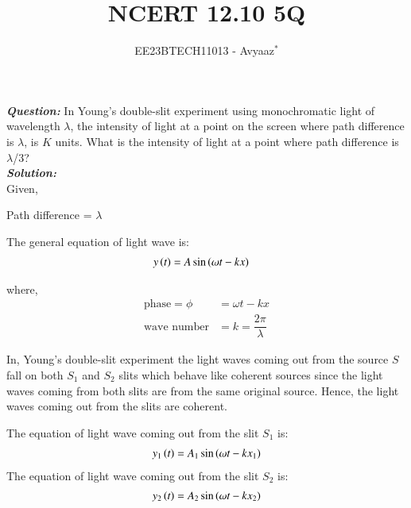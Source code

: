 \documentclass[journal,12pt,twocolumn]{IEEEtran}
\theoremstyle{remark}
\begin{document}

\vspace{3cm}

\title{NCERT 12.10 5Q}
\author{EE23BTECH11013 - Avyaaz$^{*}$%
}
\maketitle
\newpage
\bigskip

\renewcommand{\thefigure}{\theenumi}
\renewcommand{\thetable}{\arabic{table}}

\large\textbf{\textsl{Question:}}
In Young’s double-slit experiment using monochromatic light of wavelength $\lambda$, the intensity of light at a point on the screen where path difference is $\lambda$, is $K$ units. What is the intensity of light at a
point where path difference is $\lambda$/3?\\
\large\textbf{\textsl{Solution:}}\\
Given,\\
\begin{table}[htbp]
\centering

\vspace{0.2cm}
\caption{\normalsize $Parameters$}
\label{tab:parameters}
\end{table}

\hspace*{1cm}Path difference = $\lambda$

The general equation of light wave is:
\begin{align}
       y\left(t\right) &= A\sin{(\omega t - kx)} \label{eq:lightwave}
\end{align}

 where,
 \begin{align}
 \text{phase} = \phi &= \omega t - kx \nonumber \\
 \text{wave number} &= k = \dfrac{2\pi}{\lambda} \nonumber 
 \end{align}

In, Young's double-slit experiment the light waves coming out from the source $S$ fall on both $S_1$ and $S_2$ slits which behave like coherent sources since the light waves coming from both slits are from the same original source. Hence, the light waves coming out from the slits are coherent.

\vspace{0.3cm}

The equation of light wave coming out from the slit $S_1$ is:
\begin{align}
    y_1\left(t\right) = A_1\sin{(\omega t - kx_1)} 
\end{align}
The equation of light wave coming out from the slit $S_2$ is:
\begin{align}
     y_2\left(t\right) = A_2\sin{(\omega t - kx_2)}
\end{align}
\end{document}
